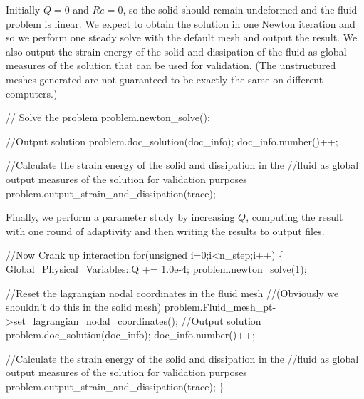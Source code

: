 Initially $ Q=0 $ and $ Re=0 $, so the solid should remain undeformed and the fluid problem is linear. We expect to obtain the solution in one Newton iteration and so we perform one steady solve with the default mesh and output the result. We also output the strain energy of the solid and dissipation of the fluid as global measures of the solution that can be used for validation. (The unstructured meshes generated are not guaranteed to be exactly the same on different computers.)


\begin{DoxyCodeInclude}

\textcolor{comment}{// Solve the problem}
problem.newton\_solve();

\textcolor{comment}{//Output solution}
problem.doc\_solution(doc\_info);
doc\_info.number()++;

\textcolor{comment}{//Calculate the strain energy of the solid and dissipation in the}
\textcolor{comment}{//fluid as global output measures of the solution for validation purposes}
problem.output\_strain\_and\_dissipation(trace);

\end{DoxyCodeInclude}


Finally, we perform a parameter study by increasing $ Q $, computing the result with one round of adaptivity and then writing the results to output files.


\begin{DoxyCodeInclude}
\textcolor{comment}{//Now Crank up interaction}
\textcolor{keywordflow}{for}(\textcolor{keywordtype}{unsigned} i=0;i<n\_step;i++)
 \{
  \hyperlink{namespaceGlobal__Physical__Variables_a66cb7ecda9ba0cd72367dd697f154545}{Global\_Physical\_Variables::Q} += 1.0e-4;
  problem.newton\_solve(1);

  \textcolor{comment}{//Reset the lagrangian nodal coordinates in the fluid mesh}
  \textcolor{comment}{//(Obviously we shouldn't do this in the solid mesh)}
  problem.Fluid\_mesh\_pt->set\_lagrangian\_nodal\_coordinates();
  \textcolor{comment}{//Output solution}
  problem.doc\_solution(doc\_info);
  doc\_info.number()++;

  \textcolor{comment}{//Calculate the strain energy of the solid and dissipation in the}
  \textcolor{comment}{//fluid as global output measures of the solution for validation purposes}
  problem.output\_strain\_and\_dissipation(trace);
 \}

\end{DoxyCodeInclude}




